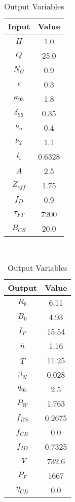 \begin{table}[h!]
\centering  
\caption{Proteus Variables}
\hfill
\begin{subtable}[t]{0.4\textwidth}
\centering  
\caption{Input Variables} ~\\
\begin{tabular}{ c|c } 

Input            & Value           \\
\hline
$H$              & 1.0              \\
$Q$              & 25.0             \\
$N_{G}$          & 0.9              \\
$\epsilon$       & 0.3              \\
$\kappa_{95}$    & 1.8              \\
$\delta_{95}$    & 0.35             \\
$\nu_{n}$        & 0.4              \\
$\nu_{T}$        & 1.1              \\
$l_{i}$          & 0.6328         \\
$A$              & 2.5              \\
$Z_{eff}$        & 1.75             \\
$f_{D}$          & 0.9              \\
$\tau_{FT}$      & 7200           \\
$B_{CS}$         & 20.0             \\

\end{tabular}
\end{subtable}
\hfill
\begin{subtable}[t]{0.5\textwidth}
\centering  
\caption{Output Variables} ~\\
\begin{tabular}{ c|c } 

Output           & Value       \\
\hline
$R_{0}$          & 6.11             \\
$B_{0}$          & 4.93            \\
$I_{P}$          & 15.54            \\
$\overline n$    & 1.16            \\
$\overline T$    & 11.25            \\
$\beta_{N}$       & 0.028            \\
$q_{95}$         & 2.5              \\
$P_{W}$          & 1.763            \\
$f_{BS}$         & 0.2675           \\
$f_{CD}$         & 0.0              \\
$f_{ID}$         & 0.7325           \\
$\volume$         & 732.6            \\
$P_{F}$          & 1667           \\
$\eta_{CD}$      & 0.0              \\


\end{tabular}
\end{subtable}
\end{table}
